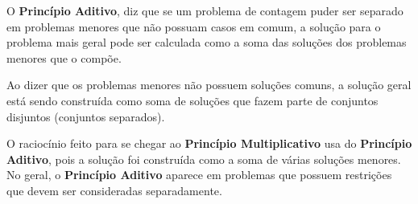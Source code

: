 O \textbf{Princípio Aditivo}, diz que se um problema de contagem puder ser separado em problemas menores que não possuam casos em comum, a solução para o problema mais geral pode ser calculada como a soma das soluções dos problemas menores que o compõe. 

Ao dizer que os problemas menores não possuem soluções comuns, a solução geral está sendo construída como soma de soluções que fazem parte de conjuntos disjuntos (conjuntos separados). 

O raciocínio feito para se chegar ao \textbf{Princípio Multiplicativo}  usa do \textbf{Princípio   Aditivo},  pois a solução foi construída como a soma de várias soluções menores. No geral, o \textbf{Princípio Aditivo} aparece em problemas que possuem restrições que devem ser consideradas separadamente. 

